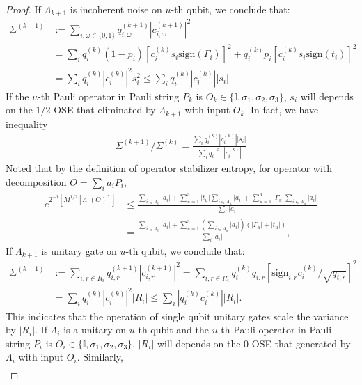 \documentclass[aps,%
twocolumn,%
floatfix,%
pra,%
amsfonts,%
longbibliography,%
groupedaddress,%
superscriptaddress]{revtex4-2}%
\newcommand{\1}{\mathbbm{1}}
\begin{document}
\begin{proof}
  If $\Lambda_{k+1}$ is incoherent noise on $u$-th qubit, we conclude that:   
   \begin{align}
        \Sigma^{(k+1)} &:= \sum_{i,\omega\in \{0,1\}} q_{i,\omega}^{(k+1)}|c_{i,\omega}^{(k+1)}|^2 \\
        &=\sum_{i} q_{i}^{(k)}(1-p_i)\left[ c_{i}^{(k)} s_i \text{sign}(\Gamma_i)\right]^2 + q_{i}^{(k)}p_i\left[ c_{i}^{(k)} s_i \text{sign}(t_i)\right]^2\\
        &=  \sum_{i} q_i^{(k)}|c_i^{(k)}|^2 s_i^2 \leq \sum_{i} q_i^{(k)}|c_i^{(k)}| |s_i|
    \end{align}
      If the $u$-th Pauli operator in Pauli string $P_k$ is $O_k \in \{\mathbb{I}, \sigma_1,\sigma_2,\sigma_3\}$, $s_i$ will depends on the $1/2$-OSE that eliminated by $\Lambda_{k+1}$ with input $O_k$.  In fact, we have inequality
      \begin{align}
          \Sigma^{(k+1)}/ \Sigma^{(k)} = \frac{\sum_{i} q_i^{(k)}|c_i^{(k)}| |s_i|}{\sum_{i} q_i^{(k)}|c_i^{(k)}| }
      \end{align}
      Noted that by the definition of operator stabilizer entropy, for operator with decomposition $O = \sum_{i } a_i P_i$, 
      \begin{align}
          e^{2^{-1}\left[ M^{1/2}[\Lambda^\dagger(O)] \right]} &\leq \frac{\sum_{i \in A_0}|a_i| + \sum_{u=1}^3 |t_u| \sum_{i \in A_u}|a_i| +\sum_{u =1}^3 |\Gamma_u|\sum_{i \in A_u}| a_i|}{\sum_{i } |a_i|}\\
          &= \frac{\sum_{i \in A_0}|a_i| + \sum_{u =1}^3\left( \sum_{i \in A_u}|a_i|\right)(| \Gamma_u| + |t_u|)}{\sum_{i}|a_i|},
      \end{align}
    If $\Lambda_{k+1}$ is unitary gate on $u$-th qubit, we conclude that:
    \begin{align}
        \Sigma^{(k+1)} &:= \sum_{i,r\in R_i} q_{i,r}^{(k+1)}|c_{i,r}^{(k+1)}|^2 =\sum_{i,r\in R_i} q_{i}^{(k)}q_{i,r} \left[ \text{sign}_{i,r} c_{i}^{(k)}/\sqrt{q_{i,r}}\right]^2\\
        &=  \sum_{i} q_i^{(k)}|c_i^{(k)}|^2 |R_i| \leq  \sum_{i} |q_i^{(k)}c_i^{(k)}| |R_i|.
    \end{align}
  This indicates that the operation of single qubit unitary gates scale the variance by $|R_i|$. 
  If $\Lambda_i$ is a unitary on $u$-th qubit and the $u$-th Pauli operator in Pauli string $P_i$ is $O_i \in \{\mathbb{I}, \sigma_1,\sigma_2,\sigma_3\}$, $|R_i|$ will depends on the $0$-OSE that generated by $\Lambda_i$ with input $O_i$. Similarly, 
    \begin{align}

\end{align}
\end{proof}
\end{document}
